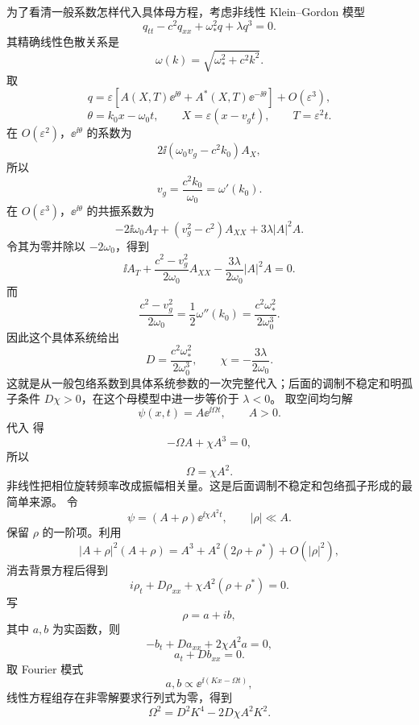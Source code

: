 为了看清一般系数怎样代入具体母方程，考虑非线性 Klein--Gordon 模型
\begin{equation*}q_{tt}-c^2q_{xx}+\omega_*^2q+\lambda q^3=0.\end{equation*}
其精确线性色散关系是
\[
\omega(k)=\sqrt{\omega_*^2+c^2k^2}.
\]
取
\[
q=\varepsilon\left[A(X,T)\ee^{\ii\theta}+A^*(X,T)\ee^{-\ii\theta}\right]+O(\varepsilon^3),
\]
\[
\theta=k_0x-\omega_0t,
\qquad
X=\varepsilon(x-v_gt),
\qquad
T=\varepsilon^2t.
\]
在 $O(\varepsilon^2)$，$\ee^{\ii\theta}$ 的系数为
\[
2\ii(\omega_0v_g-c^2k_0)A_X,
\]
所以
\[
v_g=\frac{c^2k_0}{\omega_0}=\omega'(k_0).
\]
在 $O(\varepsilon^3)$，$\ee^{\ii\theta}$ 的共振系数为
\[
-2\ii\omega_0A_T+(v_g^2-c^2)A_{XX}+3\lambda|A|^2A.
\]
令其为零并除以 $-2\omega_0$，得到
\[
\ii A_T+\frac{c^2-v_g^2}{2\omega_0}A_{XX}
-\frac{3\lambda}{2\omega_0}|A|^2A=0.
\]
而
\[
\frac{c^2-v_g^2}{2\omega_0}
=\frac12\omega''(k_0)
=\frac{c^2\omega_*^2}{2\omega_0^3}.
\]
因此这个具体系统给出
\begin{equation*}\boxed{
D=\frac{c^2\omega_*^2}{2\omega_0^3},
\qquad
\chi=-\frac{3\lambda}{2\omega_0}
}.\end{equation*}
这就是从一般包络系数到具体系统参数的一次完整代入；后面的调制不稳定和明孤子条件 $D\chi>0$，在这个母模型中进一步等价于 $\lambda<0$。
取空间均匀解
\[
\psi(x,t)=A \ee^{\ii \Omega t},
\qquad A>0.
\]
代入  得
\[
-\Omega A+\chi A^3=0,
\]
所以
\[
\boxed{\Omega=\chi A^2}.
\]
非线性把相位旋转频率改成振幅相关量。这是后面调制不稳定和包络孤子形成的最简单来源。
令
\[
\psi=(A+\rho)\ee^{\ii \chi A^2t},
\qquad |\rho|\ll A.
\]
保留 $\rho$ 的一阶项。利用
\[
|A+\rho|^2(A+\rho)
=A^3+A^2(2\rho+\rho^*)+O(|\rho|^2),
\]
消去背景方程后得到
\[
i\rho_t+D\rho_{xx}
+\chi A^2(\rho+\rho^*)=0.
\]
写
\[
\rho=a+ib,
\]
其中 $a,b$ 为实函数，则
\[
-b_t+D a_{xx}+2\chi A^2a=0,
\]
\[
a_t+D b_{xx}=0.
\]
取 Fourier 模式
\[
a,b\propto \ee^{\ii (Kx-\Omega t)},
\]
线性方程组存在非零解要求行列式为零，得到
\begin{equation*}\boxed{
\Omega^2
=D^2K^4-2D\chi A^2K^2
}.\end{equation*}

